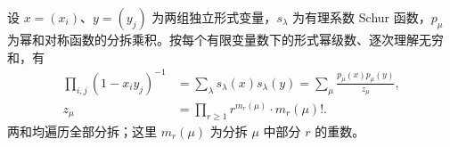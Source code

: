 \begin{lemma}\label{b5:lem:schur-cauchy}
	设 \(x=(x_i)\)、\(y=(y_j)\) 为两组独立形式变量，\(s_\lambda\) 为有理系数 Schur 函数，\(p_\mu\) 为幂和对称函数的分拆乘积。按每个有限变量数下的形式幂级数、逐次理解无穷和，有
	\begin{equation}\label{b5:eq:schur-cauchy}
		\begin{aligned}
			\prod_{i,j}(1-x_i y_j)^{-1} &=\sum_\lambda s_\lambda(x)s_\lambda(y) =\sum_\mu\frac{p_\mu(x)p_\mu(y)}{z_\mu},
			\\
			z_\mu&=\prod_{r\ge1}r^{m_r(\mu)}\cdot m_r(\mu)!.
		\end{aligned}
	\end{equation}
	两和均遍历全部分拆；这里 \(m_r(\mu)\) 为分拆 \(\mu\) 中部分 \(r\) 的重数。
\end{lemma}
